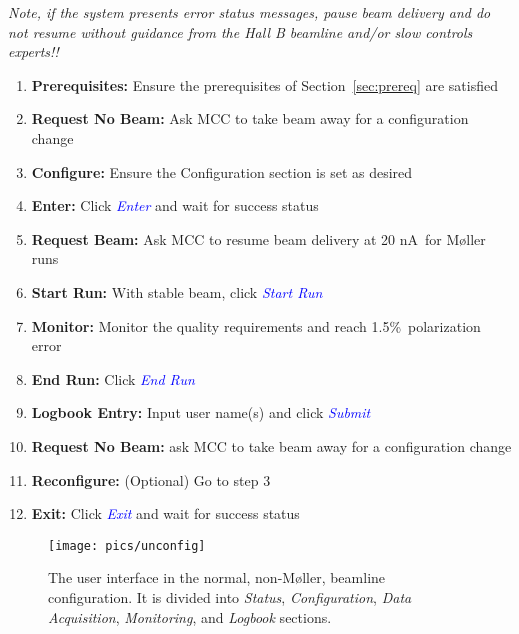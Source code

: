 \documentclass[amsmath,amssymb,notitlepage,12pt]{revtex4}
\newcommand{\ibeam}{20 nA\ }
\newcommand{\easy}{1.5\%}
\begin{document}
{\em Note, if the system presents error status messages, pause beam delivery and do not resume without guidance from the Hall B beamline and/or slow controls experts!!}
\begin{enumerate}
\vspace{-2mm}\item {\bf Prerequisites:}  Ensure the prerequisites of Section~\ref{sec:prereq} are satisfied
\vspace{-4mm}\item {\bf Request No Beam:}  Ask MCC to take beam away for a configuration change
\vspace{-4mm}\item {\bf Configure:}  Ensure the Configuration section is set as desired
\vspace{-4mm}\item {\bf Enter:} Click \textcolor{blue}{\em Enter} and wait for success status
\vspace{-4mm}\item {\bf Request Beam:} Ask MCC to resume beam delivery at \ibeam for M{\o}ller runs
\vspace{-4mm}\item {\bf Start Run:} With stable beam, click \textcolor{blue}{\em Start Run}
\vspace{-4mm}\item {\bf Monitor:} Monitor the quality requirements and reach \easy\ polarization error
\vspace{-4mm}\item {\bf End Run:} Click \textcolor{blue}{\em End Run}
\vspace{-4mm}\item {\bf Logbook Entry:} Input user name(s) and click \textcolor{blue}{\em Submit}
\vspace{-4mm}\item {\bf Request No Beam:} ask MCC to take beam away for a configuration change
\vspace{-4mm}\item {\bf Reconfigure:} (Optional) Go to step 3
\vspace{-4mm}\item {\bf Exit:} Click \textcolor{blue}{\em Exit} and wait for success status
\end{enumerate}

\begin{figure}[htbp]\centering
    \texttt{[image: pics/unconfig]}
    \caption{\label{fig:beamline}The user interface in the normal, non-M{\o}ller, beamline configuration.  It is divided into {\em Status}, {\em Configuration}, {\em Data Acquisition}, {\em Monitoring}, and {\em Logbook} sections.\label{fig:unconfig}}
\end{figure}
\end{document}
